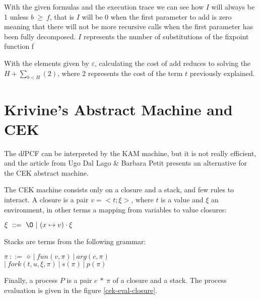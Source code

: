 \documentclass[a4paper,12pt]{article}
\begin{document}
With the given formulas and the execution trace we can see how $I$ will always
be 1 unless $b~\geq~f$, that is $I$ will be 0 when the first parameter to add is
zero meaning that there will not be more recursive calls when the first
parameter has been fully decomposed. $I$ represents the number of substitutions of
the fixpoint function f


With the elements given by $\varepsilon$, calculating the cost of add
reduces to solving the $H + \sum\limits_{b<H} (2) $, where 2
represents the cost of the term $t$ previously explained.



\section{Krivine's Abstract Machine and CEK}

The d$l$PCF can be interpreted by the KAM machine, but it is not really
efficient, and the article from Ugo Dal Lago \& Barbara Petit \cite{ldtcbv}
presents an alternative for the CEK abstract machine.

The CEK machine consists only on a closure and a stack, and few rules to
interact. A closure is a pair $v =<t;\xi>$, where $t$ is a value and $\xi$
an environment, in other terms a mapping from variables to value closures:

\begin{center}
  $\xi ~ ::=~\O~|~(x \mapsto v) \cdot \xi$
\end{center}

Stacks are terms from the following grammar:

\begin{center}
  $\pi~::=~\diamond~|~fun(v, \pi)~|~arg(c, \pi)$ \\
  $|~fork(t,u,\xi,\pi)~|~s(\pi)~|~p(\pi)$
\end{center}

Finally, a process $P$ is a pair $c~*~\pi$ of a closure and a stack. The process
evaluation is given in the figure \ref{cek-eval-closure}.
\end{document}
